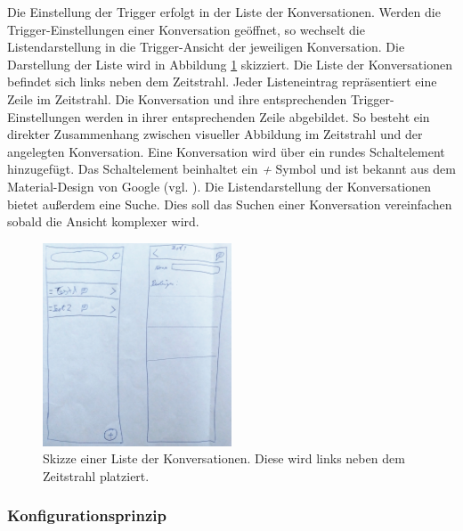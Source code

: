 Die Einstellung der Trigger erfolgt in der Liste der Konversationen. Werden die Trigger-Einstellungen einer Konversation geöffnet, so wechselt die Listendarstellung in die Trigger-Ansicht der jeweiligen Konversation. Die Darstellung der Liste wird in Abbildung \ref{liste} skizziert. Die Liste der Konversationen befindet sich links neben dem Zeitstrahl. Jeder Listeneintrag repräsentiert eine Zeile im Zeitstrahl. Die Konversation und ihre entsprechenden Trigger-Einstellungen werden in ihrer entsprechenden Zeile abgebildet. So besteht ein direkter Zusammenhang zwischen visueller Abbildung im Zeitstrahl und der angelegten Konversation. Eine Konversation wird über ein rundes Schaltelement hinzugefügt. Das Schaltelement beinhaltet ein \emph{+} Symbol und ist bekannt aus dem Material-Design von Google (vgl. \cite{Buttonsf61:online}). Die Listendarstellung der Konversationen bietet außerdem eine Suche. Dies soll das Suchen einer Konversation vereinfachen sobald die Ansicht komplexer wird. 


\begin{figure}[h]
\centering
\includegraphics[width=0.5\textwidth]{pictures/liste}
\caption{Skizze einer Liste der Konversationen. Diese wird links neben dem Zeitstrahl platziert.}
\label{liste}
\end{figure}

\subsubsection{Konfigurationsprinzip}

%
